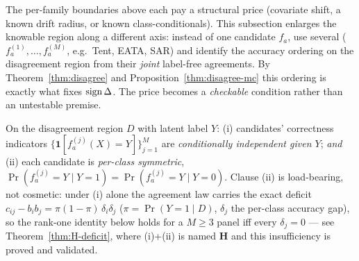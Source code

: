 
The per-family boundaries above each pay a structural price (covariate shift, a known
drift radius, or known class-conditionals). This subsection enlarges the knowable region
along a different axis: instead of one candidate $f_a$, use several
($f_a^{(1)},\dots,f_a^{(M)}$, e.g.\ Tent, EATA, SAR) and identify the accuracy ordering on
the disagreement region from their \emph{joint} label-free agreements. By
Theorem~\ref{thm:disagree} and Proposition~\ref{thm:disagree-mc} this ordering is exactly what fixes
$\operatorname{sign}\Delta$. The price becomes a \emph{checkable} condition rather than an untestable
premise.

\begin{definition}\label{def:cei}
On the disagreement region $D$ with latent label $Y$: (i) candidates' correctness indicators
$\{\mathbf1[f_a^{(j)}(X){=}Y]\}_{j=1}^M$ are \emph{conditionally independent given $Y$};
\emph{and} (ii) each candidate is \emph{per-class symmetric},
$\Pr(f_a^{(j)}{=}Y\mid Y{=}1)=\Pr(f_a^{(j)}{=}Y\mid Y{=}0)$.
Clause (ii) is load-bearing, not cosmetic: under (i) alone the agreement law carries the
exact deficit $c_{ij}-b_ib_j=\pi(1-\pi)\,\delta_i\delta_j$ ($\pi=\Pr(Y{=}1\mid D)$,
$\delta_j$ the per-class accuracy gap), so the rank-one identity below holds for a
$M\ge3$ panel iff every $\delta_j=0$ --- see Theorem~\ref{thm:H-deficit}, where (i)+(ii)
is named \textbf{H} and this insufficiency is proved and validated.
\end{definition}

